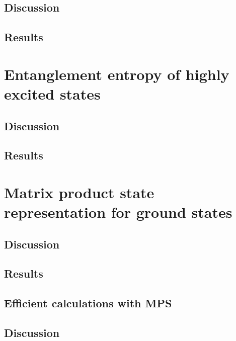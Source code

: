 \documentclass{article}
\begin{document}
\subsection{
Discussion
}



\subsection{
Results
}



\newpage

\section{
Entanglement entropy of highly excited states
}


\subsection{
Discussion
}



\subsection{
Results
}



\newpage

\section{
Matrix product state representation for ground states
}


\subsection{
Discussion
}



\subsection{
Results
}



\newpage

\subsection{
Efficient calculations with MPS
}

\subsection{
Discussion
}
\end{document}
